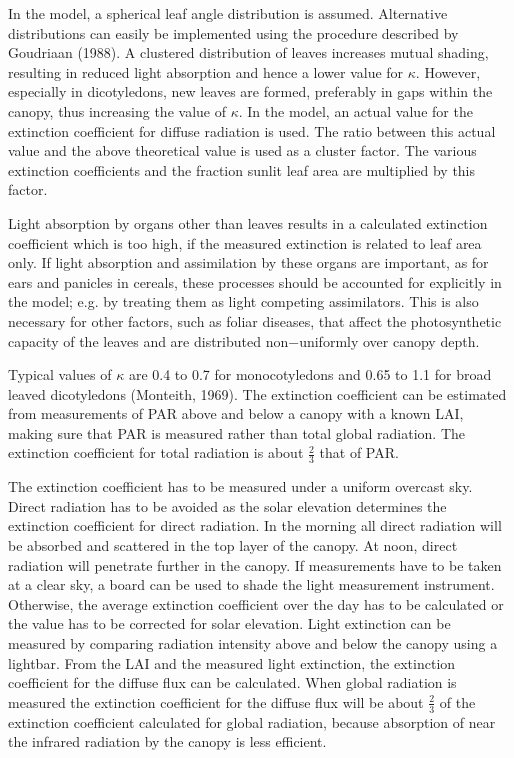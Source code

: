In the model, a spherical leaf angle distribution is assumed. Alternative distributions can easily be implemented using the procedure described by Goudriaan (1988). A clustered distribution of leaves increases mutual shading, resulting in reduced light absorption and hence a lower value for $\kappa$. However, especially in dicotyledons, new leaves are formed, preferably in gaps within the canopy, thus increasing the value of $\kappa$. In the model, an actual value for the extinction coefficient for diffuse radiation is used. The ratio between this actual value and the above theoretical value is used as a cluster factor. The various extinction coefficients and the fraction sunlit leaf area are multiplied by this factor.

Light absorption by organs other than leaves results in a calculated extinction coefficient which is too high, if the measured extinction is related to leaf area only. If light absorption and assimilation by these organs are important, as for ears and panicles in cereals, these processes should be accounted for explicitly in the model; e.g. by treating them as light competing assimilators. This is also necessary for other factors, such as foliar diseases, that affect the photosynthetic capacity of the leaves and are distributed non$-$uniformly over canopy depth.

Typical values of $\kappa$ are 0.4 to 0.7 for monocotyledons and 0.65 to 1.1 for broad leaved dicotyledons (Monteith, 1969). The extinction coefficient can be estimated from measurements of PAR above and below a canopy with a known LAI, making sure that PAR is measured rather than total global radiation. The extinction coefficient for total radiation is about $\frac{2}{3}$ that of PAR. 

The extinction coefficient has to be measured under a uniform overcast sky. Direct radiation has to be avoided as the solar elevation determines the extinction coefficient for direct radiation. In the morning all direct radiation will be absorbed and scattered in the top layer of the canopy. At noon, direct radiation will penetrate further in the canopy. If measurements have to be taken at a clear sky, a board can be used to shade the light measurement instrument. Otherwise, the average extinction coefficient over the day has to be calculated or the value has to be corrected for solar elevation. Light extinction can be measured by comparing radiation intensity above and below the canopy using a lightbar. From the LAI and the measured light extinction, the extinction coefficient for the diffuse flux can be calculated. When global radiation is measured the extinction coefficient for the diffuse flux will be about $\frac{2}{3}$ of the extinction coefficient calculated for global radiation, because absorption of near the infrared radiation by the canopy is less efficient.

